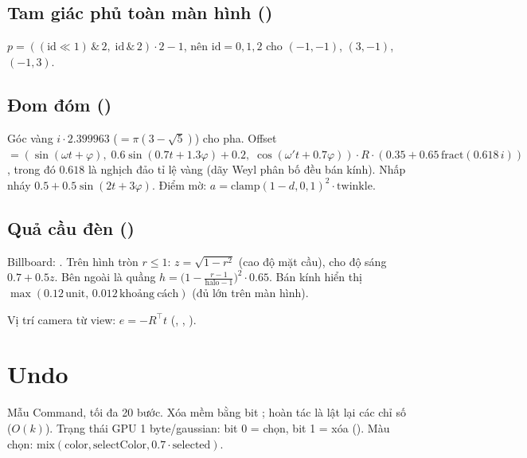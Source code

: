 \subsection{Tam giác phủ toàn màn hình ()}
$p=((\mathrm{id}\ll1)\,\&\,2,\;\mathrm{id}\,\&\,2)\cdot2-1$, nên $\mathrm{id}=0,1,2$ cho $(-1,-1)$, $(3,-1)$, $(-1,3)$.

\subsection{Đom đóm ()}
Góc vàng $i\cdot2.399963$ ($=\pi(3-\sqrt5)$) cho pha. Offset $=(\sin(\omega t+\varphi),\;0.6\sin(0.7t+1.3\varphi)+0.2,\;\cos(\omega't+0.7\varphi))\cdot R\cdot(0.35+0.65\,\mathrm{fract}(0.618\,i))$, trong đó $0.618$ là nghịch đảo tỉ lệ vàng (dãy Weyl phân bố đều bán kính). Nhấp nháy $0.5+0.5\sin(2t+3\varphi)$. Điểm mờ: $a=\mathrm{clamp}(1-d,0,1)^2\cdot\mathrm{twinkle}$.

\subsection{Quả cầu đèn ()}
Billboard: . Trên hình tròn $r\le1$: $z=\sqrt{1-r^2}$ (cao độ mặt cầu), cho độ sáng $0.7+0.5z$. Bên ngoài là quầng $h=\big(1-\frac{r-1}{\mathrm{halo}-1}\big)^2\cdot0.65$. Bán kính hiển thị $\max(0.12\,\mathrm{unit},\,0.012\,\mathrm{khoảng\ cách})$ (đủ lớn trên màn hình).

Vị trí camera từ view: $e=-R^{\top}t$ (, , ).

\section{Undo}
Mẫu Command, tối đa 20 bước. Xóa mềm bằng bit ; hoàn tác là lật lại các chỉ số ($O(k)$). Trạng thái GPU 1 byte/gaussian: bit 0 = chọn, bit 1 = xóa (). Màu chọn: $\mathrm{mix}(\mathrm{color},\mathrm{selectColor},0.7\cdot\mathrm{selected})$.

